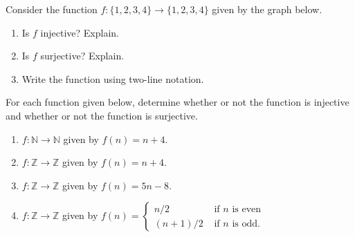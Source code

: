 \documentclass[10pt,]{book}
\theoremstyle{plain}
\theoremstyle{definition}
\theoremstyle{definition}
\theoremstyle{definition}
\theoremstyle{definition}
\numberwithin{equation}{chapter}
\def\N{\mathbb N}
\def\Z{\mathbb Z}
\newcommand{\amp}{&}
\begin{document}
\begin{divisionexercise}{4}\hypertarget{exercise-206}{}
\hypertarget{p-1799}{}%
Consider the function \(f:\{1,2,3,4\} \to \{1,2,3,4\}\) given by the graph below.%
\begin{sidebyside}{1}{0.3}{0.3}{0}
\begin{sbspanel}{0.4}
\end{sbspanel}
\end{sidebyside}
\par
\hypertarget{p-1800}{}%
\leavevmode%
\begin{enumerate}[label=(\alph*)]
\item\hypertarget{li-567}{}\hypertarget{p-1801}{}%
Is \(f\) injective? Explain.%
\item\hypertarget{li-568}{}\hypertarget{p-1802}{}%
Is \(f\) surjective? Explain.%
\item\hypertarget{li-569}{}\hypertarget{p-1803}{}%
Write the function using two-line notation.%
\end{enumerate}
%
\end{divisionexercise}%
\begin{divisionexercise}{5}\hypertarget{exercise-207}{}
\hypertarget{p-1808}{}%
For each function given below, determine whether or not the function is injective and whether or not the function is surjective. \leavevmode%
\begin{enumerate}[label=(\alph*)]
\item\hypertarget{li-573}{}\(f:\N \to \N\) given by \(f(n) = n+4\).%
\item\hypertarget{li-574}{}\(f:\Z \to \Z\) given by \(f(n) = n+4\).%
\item\hypertarget{li-575}{}\(f:\Z \to \Z\) given by \(f(n) = 5n - 8\).%
\item\hypertarget{li-576}{}\(f:\Z \to \Z\) given by \(f(n) = \begin{cases}n/2 \amp  \text{ if } n \text{ is even} \\ (n+1)/2 \amp \text{ if } n \text{ is odd} . \end{cases}\)%
\end{enumerate}
%
\end{divisionexercise}%
\end{document}
